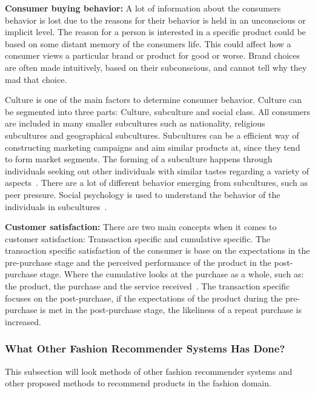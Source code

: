 \textbf{Consumer buying behavior:}
A lot of information about the consumers behavior is lost due to the reasons for their behavior is held in an unconscious or implicit level.
The reason for a person is interested in a specific product could be based on some distant memory of the consumers life.
This could affect how a consumer views a particular brand or product for good or worse.
Brand choices are often made intuitively, based on their subconscious, and cannot tell why they mad that choice.

Culture is one of the main factors to determine consumer behavior.
Culture can be segmented into three parts: Culture, subculture and social class.
All consumers are included in many smaller subcultures such as nationality, religious subcultures and geographical subcultures.
Subcultures can be a efficient way of constructing marketing campaigns and aim similar products at, since they tend to form market segments.
The forming of a subculture happens through individuals seeking out other individuals with similar tastes regarding a variety of aspects~\cite{vignali2009fashion}.
There are a lot of different behavior emerging from subcultures, such as peer pressure.
Social psychology is used to understand the behavior of the individuals in subcultures~\cite{vignali2009fashion}.

\textbf{Customer satisfaction:}
There are two main concepts when it comes to customer satisfaction:
Transaction specific and cumulative specific.
The transaction specific satisfaction of the consumer is base on the expectations in the pre-purchase stage and the perceived performance of the product in the post-purchase stage.
Where the cumulative looks at the purchase as a whole, such as: the product, the purchase and the service received~\cite{kumari2012}.
The transaction specific focuses on the post-purchase, if the expectations of the product during the pre-purchase is met in the post-purchase stage, the likeliness of a repeat purchase is increased.



\subsubsection{What Other Fashion Recommender Systems Has Done?} %
This subsection will look methods of other fashion recommender systems and other proposed methods to recommend products in the fashion domain.


